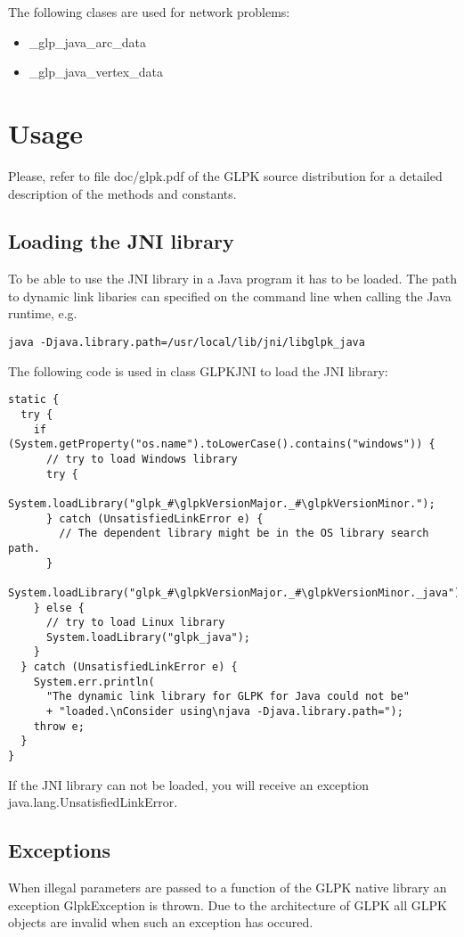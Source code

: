 \documentclass[a4paper,11pt]{report}
\newcommand{\glpkVersionMajor}{4}
\newcommand{\glpkVersionMinor}{54}
\begin{document}
The following clases are used for network problems:
\begin{itemize}
\item \_glp\_java\_arc\_data
\item \_glp\_java\_vertex\_data
\end{itemize}

\chapter{Usage}
Please, refer to file doc/glpk.pdf of the GLPK source distribution for a detailed description of the methods and constants.

\section{Loading the JNI library}
To be able to use the JNI library in a Java program it has to be loaded.
The path to dynamic link libaries can specified on the command line when
calling the Java runtime, e.g.
\begin{verbatim}
java -Djava.library.path=/usr/local/lib/jni/libglpk_java
\end{verbatim}

The following code is used in class GLPKJNI to load the JNI library:

\begin{lstlisting}
static {
  try {
    if (System.getProperty("os.name").toLowerCase().contains("windows")) {
      // try to load Windows library
      try {
        System.loadLibrary("glpk_#\glpkVersionMajor._#\glpkVersionMinor.");
      } catch (UnsatisfiedLinkError e) {
        // The dependent library might be in the OS library search path.
      }
      System.loadLibrary("glpk_#\glpkVersionMajor._#\glpkVersionMinor._java");
    } else {
      // try to load Linux library
      System.loadLibrary("glpk_java");
    }
  } catch (UnsatisfiedLinkError e) {
    System.err.println(
      "The dynamic link library for GLPK for Java could not be"
      + "loaded.\nConsider using\njava -Djava.library.path=");
    throw e;
  }
}
\end{lstlisting}

If the JNI library can not be loaded, you will receive an exception
\linebreak java.lang.UnsatisfiedLinkError.

\section{Exceptions}
When illegal parameters are passed to a function of the GLPK native library
an exception GlpkException is thrown. Due to the architecture of GLPK all
GLPK objects are invalid when such an exception has occured.
\end{document}
